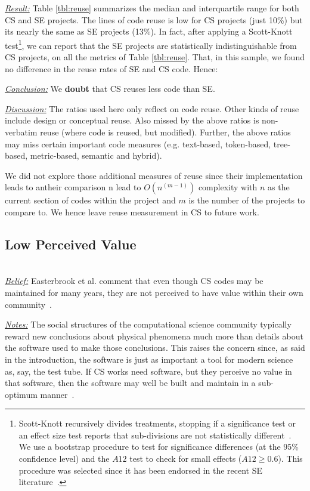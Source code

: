 \documentclass[sigconf,review,anonymous]{acmart}
\newenvironment{RQ}{\vspace{1mm}\begin{tcolorbox}[enhanced,width=3.4in,size=fbox,colback=red!5!white,drop shadow southeast,sharp corners]}{\end{tcolorbox}}
\begin{document}
\noindent \textit{\underline{Result:}} Table \ref{tbl:reuse} summarizes the median and interquartile range for both CS and SE projects. The lines of code reuse is low for CS projects (just 10\%) but its nearly the same as SE projects (13\%). In fact,
after applying a Scott-Knott test\footnote{
Scott-Knott recursively divides treatments, stopping if
a significance test or an effect size test reports that sub-divisions are
not statistically different~\cite{mittas2013ranking, ghotra15}.
We use a bootstrap procedure to test for significance differences (at the 95\% confidence level) 
and the $\mathit{A12}$ test to check for small effects ($\mathit{A12} \ge 0.6$).
This procedure was selected
since it has been endorsed in the recent SE literature~\cite{mittas2013ranking,arcuri2011practical}.}, 
we can report that the SE projects are statistically
indistinguishable from CS projects, on all the metrics of Table \ref{tbl:reuse}. 
That, in this sample, we found no difference in the reuse rates
of SE and CS code. Hence: 
\begin{RQ} 
\textit{\underline{Conclusion:}} We \textbf{doubt} that CS reuses less code  than SE. 
\end{RQ}

\noindent \textit{\underline{Discussion:}} 
The ratios used here only reflect on code reuse.
Other kinds of reuse include design or conceptual reuse. 
Also missed by the above ratios is non-verbatim reuse (where code is reused, but modified).
Further, the above ratios may miss certain important code measures
(e.g. text-based, token-based, tree-based, metric-based, semantic and hybrid).

We did not explore those additional measures of reuse since
their implementation leads to antheir comparison n lead to $O(n^{(m-1)})$ complexity with $n$ as the current section of codes within the project and $m$ is the number of the projects to compare to. We hence leave reuse measurement in CS to  future work.

\subsection{Low Perceived Value} ~\\
\noindent \textit{\underline{Belief:}} 
Easterbrook et al. comment that even though CS codes
may be maintained for many years,
they are not perceived to have value within their own community~\cite{faulk09_secs, segal07_enduser, easterbrook_cs, boyle09_lessons}.

\noindent \textit{\underline{Notes:}} The social structures of the computational science community
typically reward new conclusions about physical phenomena much more than
details about the software used
to make those conclusions. This raises the concern since, as said in the introduction, the software is just as important a tool for modern science as, say, the test tube. If CS works need software,
but they perceive no value in that software, then the software may well be built and maintain in a sub-optimum manner~\cite{sanders08_risk}. 
\end{document}

